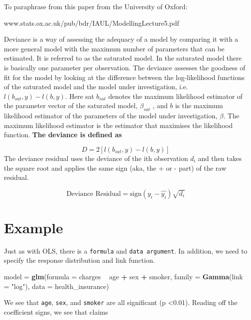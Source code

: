 \documentclass[openany]{book}
\newenvironment{Shaded}{\begin{snugshade}}{\end{snugshade}}
\newcommand{\DataTypeTok}[1]{\textcolor[rgb]{0.13,0.29,0.53}{#1}}
\newcommand{\KeywordTok}[1]{\textcolor[rgb]{0.13,0.29,0.53}{\textbf{#1}}}
\newcommand{\NormalTok}[1]{#1}
\newcommand{\OperatorTok}[1]{\textcolor[rgb]{0.81,0.36,0.00}{\textbf{#1}}}
\newcommand{\StringTok}[1]{\textcolor[rgb]{0.31,0.60,0.02}{#1}}
\begin{document}
To paraphrase from this paper from the University of Oxford:

www.stats.ox.ac.uk/pub/bdr/IAUL/ModellingLecture5.pdf

Deviance is a way of assessing the adequacy of a model by comparing it with a more general
model with the maximum number of parameters that can be estimated. It is referred to
as the saturated model. In the saturated model there is basically one parameter per
observation. The deviance assesses the goodness of fit for the model by looking at the
difference between the log-likelihood functions of the saturated model and the model
under investigation, i.e.~\(l(b_{sat},y) - l(b,y)\). Here sat \(b_{sat}\) denotes the maximum likelihood
estimator of the parameter vector of the saturated model, \(\beta_{sat}\) , and \(b\) is the maximum
likelihood estimator of the parameters of the model under investigation, \(\beta\). The maximum likelihood estimator is the estimator that maximises the likelihood function. \textbf{The deviance is defined as}

\[D = 2[l(b_{sat},y) - l(b,y)]\]
The deviance residual uses the deviance of the ith observation \(d_i\) and then takes the square root and applies the same sign (aka, the + or - part) of the raw residual.

\[\text{Deviance Residual} = \text{sign}(y_i - \hat{y_i})\sqrt{d_i}\]

\hypertarget{example-1}{%
\section{Example}\label{example-1}}

Just as with OLS, there is a \texttt{formula} and \texttt{data\ argument}. In addition, we need to specify the response distribution and link function.

\begin{Shaded}
\begin{Highlighting}[]
\NormalTok{model =}\StringTok{ }\KeywordTok{glm}\NormalTok{(}\DataTypeTok{formula =}\NormalTok{ charges }\OperatorTok{~}\StringTok{ }\NormalTok{age }\OperatorTok{+}\StringTok{ }\NormalTok{sex }\OperatorTok{+}\StringTok{ }\NormalTok{smoker, }
            \DataTypeTok{family =} \KeywordTok{Gamma}\NormalTok{(}\DataTypeTok{link =} \StringTok{"log"}\NormalTok{),}
            \DataTypeTok{data =}\NormalTok{ health_insurance)}
\end{Highlighting}
\end{Shaded}

We see that \texttt{age}, \texttt{sex}, and \texttt{smoker} are all significant (p \textless0.01). Reading off the coefficient signs, we see that claims
\end{document}
